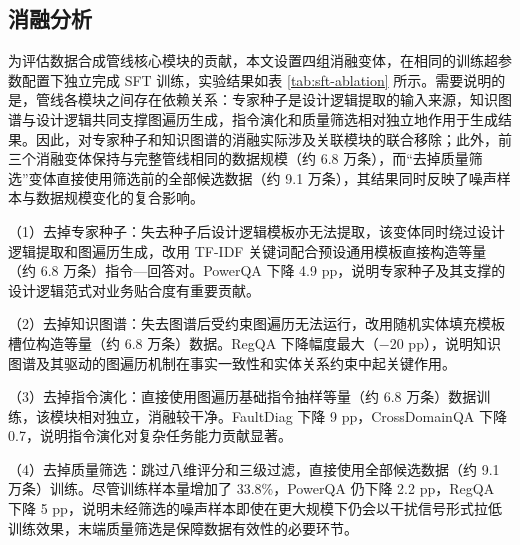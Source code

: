 \documentclass[fontset=fandol,type=master,campus=shenzhen,etitleauto=true]{hithesisbook}
\begin{document}
\subsection{消融分析}\label{ux6d88ux878dux5206ux6790}

为评估数据合成管线核心模块的贡献，本文设置四组消融变体，在相同的训练超参数配置下独立完成 SFT 训练，实验结果如表 \ref{tab:sft-ablation} 所示。需要说明的是，管线各模块之间存在依赖关系：专家种子是设计逻辑提取的输入来源，知识图谱与设计逻辑共同支撑图遍历生成，指令演化和质量筛选相对独立地作用于生成结果。因此，对专家种子和知识图谱的消融实际涉及关联模块的联合移除；此外，前三个消融变体保持与完整管线相同的数据规模（约 6.8 万条），而``去掉质量筛选''变体直接使用筛选前的全部候选数据（约 9.1 万条），其结果同时反映了噪声样本与数据规模变化的复合影响。

（1）去掉专家种子：失去种子后设计逻辑模板亦无法提取，该变体同时绕过设计逻辑提取和图遍历生成，改用 TF-IDF 关键词配合预设通用模板直接构造等量（约 6.8 万条）指令---回答对。PowerQA 下降 4.9 pp，说明专家种子及其支撑的设计逻辑范式对业务贴合度有重要贡献。

（2）去掉知识图谱：失去图谱后受约束图遍历无法运行，改用随机实体填充模板槽位构造等量（约 6.8 万条）数据。RegQA 下降幅度最大（$-20$ pp），说明知识图谱及其驱动的图遍历机制在事实一致性和实体关系约束中起关键作用。

（3）去掉指令演化：直接使用图遍历基础指令抽样等量（约 6.8 万条）数据训练，该模块相对独立，消融较干净。FaultDiag 下降 9 pp，CrossDomainQA 下降 0.7，说明指令演化对复杂任务能力贡献显著。

（4）去掉质量筛选：跳过八维评分和三级过滤，直接使用全部候选数据（约 9.1 万条）训练。尽管训练样本量增加了 33.8\%，PowerQA 仍下降 2.2 pp，RegQA 下降 5 pp，说明未经筛选的噪声样本即使在更大规模下仍会以干扰信号形式拉低训练效果，末端质量筛选是保障数据有效性的必要环节。

\begin{table}[htbp]
\centering
\caption{SFT数据合成管线消融实验结果}
\label{tab:sft-ablation}
\small
{}
\end{table}
\end{document}
